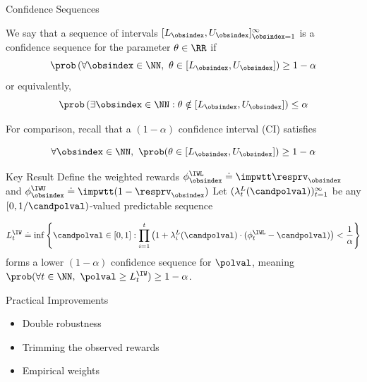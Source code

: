 \documentclass[aspectratio=169, professionalfonts]{beamer}
\begin{document}
\begin{frame}{Confidence Sequences}
	\begin{definition}
		We say that a sequence of intervals $[L_\obsindex, U_\obsindex]_{\obsindex=1}^\infty$ is a confidence sequence for the parameter $\theta \in \RR$ if
		\begin{equation*}\label{eq:cs}
			\prob \left ( \forall \obsindex \in \NN,\ \theta \in [L_\obsindex, U_\obsindex] \right ) \geq 1-\alpha \end{equation*}
		or equivalently,
		\begin{equation*}
			\prob \left ( \exists \obsindex \in \NN : \theta \notin [L_\obsindex, U_\obsindex] \right ) \leq \alpha
		\end{equation*}
	\end{definition}

	\vfill \pause
	For comparison, recall that a $(1- \alpha)$ confidence interval (CI) satisfies

	$$\forall \obsindex \in \NN,\ \prob(\theta \in [L_\obsindex, U_\obsindex]) \geq 1-\alpha$$
\end{frame}

\begin{frame}{Key Result}
	Define the weighted rewards $\phi_\obsindex^\IWL \doteq \impwtt \resprv_\obsindex$ and $\phi_\obsindex^\IWU \doteq
		\impwtt(1-\resprv_\obsindex)$
	\vfill
	Let   $(\lambda_t^L(\candpolval))_{t=1}^\infty$ be any $[0, 1/\candpolval)$-valued
	predictable sequence

	\vfill
	\begin{equation}\label{eq:kmr-cs}
		L_t^\IW \doteq \inf\left \{ \candpolval \in [0, 1] : \prod_{i=1}^t \left ( 1 + \lambda_i^L(\candpolval) \cdot (\phi_t^\IWL - \candpolval) \right ) < \frac{1}{\alpha} \right \}
	\end{equation}
	forms a lower $(1-\alpha)$ confidence sequence for $\polval$, meaning
	\vfill                  \vfill
	$\prob(\forall t \in \NN,\ \polval \geq L_t^\IW) \geq 1-\alpha$.
\end{frame}

\begin{frame}{Practical Improvements}
	\begin{itemize}
		\item Double robustness
		\item Trimming the observed rewards
		\item Empirical weights
	\end{itemize}
\end{frame}
\end{document}
